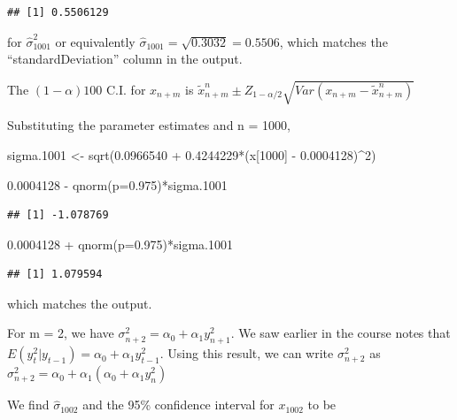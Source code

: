 \documentclass[
]{book}
\newenvironment{Shaded}{\begin{snugshade}}{\end{snugshade}}
\newcommand{\AttributeTok}[1]{\textcolor[rgb]{0.77,0.63,0.00}{#1}}
\newcommand{\DecValTok}[1]{\textcolor[rgb]{0.00,0.00,0.81}{#1}}
\newcommand{\FloatTok}[1]{\textcolor[rgb]{0.00,0.00,0.81}{#1}}
\newcommand{\FunctionTok}[1]{\textcolor[rgb]{0.00,0.00,0.00}{#1}}
\newcommand{\NormalTok}[1]{#1}
\newcommand{\OtherTok}[1]{\textcolor[rgb]{0.56,0.35,0.01}{#1}}
\newcommand{\SpecialCharTok}[1]{\textcolor[rgb]{0.00,0.00,0.00}{#1}}
\theoremstyle{definition}
\theoremstyle{definition}
\theoremstyle{definition}
\theoremstyle{definition}
\theoremstyle{remark}
\begin{document}
\begin{verbatim}
## [1] 0.5506129
\end{verbatim}

for \(\hat \sigma_{1001}^2\) or equivalently \(\hat \sigma_{1001}=\sqrt{0.3032}=0.5506\), which matches the ``standardDeviation'' column in the output.

The \((1 - \alpha)100%
\) C.I. for \(x_{n+m}\) is \(\tilde x^n_{n+m}\pm Z_{1-\alpha/2}\sqrt{Var(x_{n+m}-\tilde x^n_{n+m})}\)

Substituting the parameter estimates and n = 1000,

\begin{Shaded}
\begin{Highlighting}[]
\NormalTok{sigma}\FloatTok{.1001} \OtherTok{\textless{}{-}} \FunctionTok{sqrt}\NormalTok{(}\FloatTok{0.0966540} \SpecialCharTok{+} \FloatTok{0.4244229}\SpecialCharTok{*}\NormalTok{(x[}\DecValTok{1000}\NormalTok{] }\SpecialCharTok{{-}} \FloatTok{0.0004128}\NormalTok{)}\SpecialCharTok{\^{}}\DecValTok{2}\NormalTok{)}

\FloatTok{0.0004128} \SpecialCharTok{{-}} \FunctionTok{qnorm}\NormalTok{(}\AttributeTok{p=}\FloatTok{0.975}\NormalTok{)}\SpecialCharTok{*}\NormalTok{sigma}\FloatTok{.1001}
\end{Highlighting}
\end{Shaded}

\begin{verbatim}
## [1] -1.078769
\end{verbatim}

\begin{Shaded}
\begin{Highlighting}[]
\FloatTok{0.0004128} \SpecialCharTok{+} \FunctionTok{qnorm}\NormalTok{(}\AttributeTok{p=}\FloatTok{0.975}\NormalTok{)}\SpecialCharTok{*}\NormalTok{sigma}\FloatTok{.1001}
\end{Highlighting}
\end{Shaded}

\begin{verbatim}
## [1] 1.079594
\end{verbatim}

which matches the output.

For m = 2, we have \(\sigma^2_{n+2}=\alpha_0+\alpha_1y^2_{n+1}\). We saw earlier in the course notes that \(E(y_t^2|y_{t-1})= \alpha_0 + \alpha_1y^2_{t-1}\). Using this result, we can write \(\sigma_{n+2}^2\) as \(\sigma_{n+2}^2=\alpha_0+\alpha_1(\alpha_0+\alpha_1y^2_n)\)

We find \(\hat \sigma_{1002}\) and the 95\% confidence interval for \(x_{1002}\) to be
\end{document}
